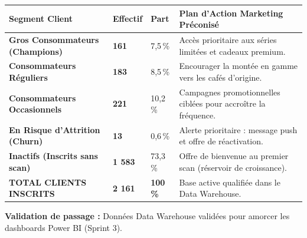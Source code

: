 \documentclass[11pt,a4paper]{article}
\begin{document}
\noindent
\renewcommand{\arraystretch}{0.98}
\begin{tabularx}{\textwidth}{>{\scriptsize}p{5.0cm} >{\centering\scriptsize\bfseries}p{1.5cm} >{\centering\scriptsize}p{1.2cm} >{\scriptsize}X}
\toprule
\rowcolor{c5border!75}\color{white}\textbf{Segment Client} & \color{white}\textbf{Effectif} & \color{white}\textbf{Part} & \color{white}\textbf{Plan d'Action Marketing Préconisé} \\
\midrule
\rowcolor{c5bg!50}\textbf{Gros Consommateurs (Champions)} & 161 & 7,5\,\% & Accès prioritaire aux séries limitées et cadeaux premium. \\
\rowcolor{white}\textbf{Consommateurs Réguliers} & 183 & 8,5\,\% & Encourager la montée en gamme vers les cafés d'origine. \\
\rowcolor{c5bg!50}\textbf{Consommateurs Occasionnels} & 221 & 10,2\,\% & Campagnes promotionnelles ciblées pour accroître la fréquence. \\
\rowcolor{white}\textbf{En Risque d'Attrition (Churn)} & 13 & 0,6\,\% & Alerte prioritaire : message push et offre de réactivation. \\
\rowcolor{c5bg!50}\textbf{Inactifs (Inscrits sans scan)} & 1 583 & 73,3\,\% & Offre de bienvenue au premier scan (réservoir de croissance). \\
\midrule
\rowcolor{white}\textbf{TOTAL CLIENTS INSCRITS} & \textbf{2 161} & \textbf{100\,\%} & Base active qualifiée dans le Data Warehouse. \\
\bottomrule
\end{tabularx}

\vspace{0.2cm}

\begin{center}
  \scriptsize
  \textcolor{c1border}{\textbf{Validation de passage :}} Données Data Warehouse validées pour amorcer les dashboards Power BI (Sprint 3).
\end{center}

\end{document}
